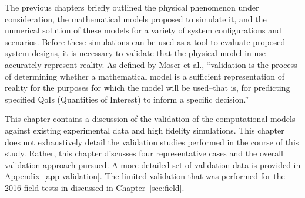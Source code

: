 
\label{sec:validation}

%
%
%

%
%

The previous chapters briefly outlined the physical phenomenon under
consideration, the mathematical models proposed to simulate it,
and the numerical solution of these models for a variety of system 
configurations and scenarios. Before these simulations can be used 
as a tool to evaluate proposed system designs, it is necessary to
validate that the physical model in use accurately represent
reality. As defined by Moser et al.\cite{Moser2012Validating},
``validation is the process of determining whether a mathematical model
is a sufficient representation of reality for the purposes for which the
model will be used--that is, for predicting specified QoIs (Quantities
of Interest) to inform a specific decision.'' 

This chapter contains a discussion of the validation of the
computational models against existing experimental data and high
fidelity simulations. This chapter does not exhaustively detail the
validation studies performed in the course of this study. Rather, this
chapter discusses four representative cases and the overall validation
approach pursued. A more detailed set of validation data is provided in 
Appendix~\ref{app-validation}. The limited validation that was performed
for the 2016 field tests in discussed in Chapter~\ref{sec:field}. 

